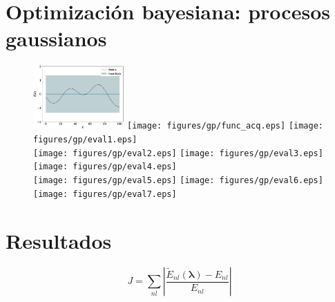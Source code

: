 \section{Optimización bayesiana: procesos gaussianos}
\label{sec:gaussianprocess}


\begin{figure}[H]
\centering
 \includegraphics[width=0.31\textwidth]{figures/gp/funcion.eps} 
 \texttt{[image: figures/gp/func\_acq.eps]} 
 \texttt{[image: figures/gp/eval1.eps]} \\
  \texttt{[image: figures/gp/eval2.eps]}
  \texttt{[image: figures/gp/eval3.eps]}
  \texttt{[image: figures/gp/eval4.eps]} \\
  \texttt{[image: figures/gp/eval5.eps]}
  \texttt{[image: figures/gp/eval6.eps]}
  \texttt{[image: figures/gp/eval7.eps]} 
\end{figure}


\newpage
\section{Resultados}


\begin{equation}
J = \sum_{nl} \left|\frac{\widetilde{E}_{nl}(\boldsymbol{\lambda}) 
- E_{nl}}{E_{nl}} \right|
\end{equation}

